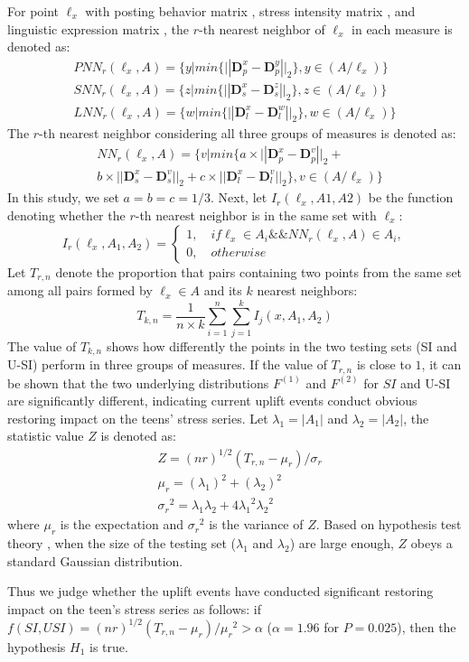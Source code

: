 For point $\ell_x$ with posting behavior matrix , stress intensity matrix ,
and linguistic expression matrix ,
the $r$-th nearest neighbor of $\ell_x$ in each measure is denoted as:
\begin{equation}
\begin{aligned}
& PNN_r(\ell_x,A)
= \{y | min\{||\textbf{D}_p^x-\textbf{D}_p^y ||_2\}, y\in(A/\ell_x)\} &\\
& SNN_r(\ell_x,A)
= \{z | min\{||\textbf{D}_s^x-\textbf{D}_s^z ||_2\}, z\in(A/\ell_x)\} \\
& LNN_r(\ell_x,A)
= \{w | min\{||\textbf{D}_l^x-\textbf{D}_l^w ||_2\}, w\in(A/\ell_x)\} &
 \end{aligned}
 \end{equation}
The $r$-th nearest neighbor considering all three groups of measures is denoted as:
\begin{align}
&NN_r(\ell_x,A) = \{v | min\{a \times ||\textbf{D}_p^x-\textbf{D}_p^v||_2+\\
&b \times ||\textbf{D}_s^x-\textbf{D}_s^v||_2+
c \times ||\textbf{D}_l^x-\textbf{D}_l^v||_2\}, v\in(A/\ell_x) \}
\end{align}
In this study, we set $a = b = c = 1/3$.
Next, let $I_r(\ell_x,A1,A2)$ be the function denoting whether the $r$-th nearest neighbor is in the same set with $\ell_x$:
\begin{equation}
I_r(\ell_x,A_1,A_2) =
\left\{ \begin{array}{ll}
1, \quad if \ell_x \in A_i  \&\& NN_r(\ell_x,A)\in A_i,\\
0, \quad otherwise
\end{array}
\right.
\end{equation}
Let $T_{r,n}$ denote the proportion that pairs containing two points from the same set among all pairs formed by $\ell_x \in A$
and its $k$ nearest neighbors:
\begin{equation}
T_{k,n}= \frac{1}{n\times k}\sum_{i=1}^{n}\sum_{j=1}^{k}I_j(x,A_1,A_2)
\end{equation}
The value of $T_{k,n}$ shows how differently the points in the two testing sets (SI and U-SI) perform in three groups of measures.
If the value of $T_{r,n}$ is close to $1$,
it can be shown that the two underlying distributions $F^{(1)}$ and $F^{(2)}$ for $SI$ and U-SI are significantly different,
indicating current uplift events conduct obvious restoring impact on the teens' stress series.
Let $\lambda_1=|A_1|$ and $\lambda_2=|A_2|$, the statistic value $Z$ is denoted as:
\begin{align}
&Z=(nr)^{1/2}(T_{r,n}-\mu_{r})/\sigma_{r}\\
&\mu_r=(\lambda_1)^2+(\lambda_2)^2\\
&{\sigma_r}^2=\lambda_1\lambda_2+4{\lambda_1}^2{\lambda_2}^2
\end{align}
where $\mu_r$ is the expectation and ${\sigma_r}^2$ is the variance of $Z$.
Based on hypothesis test theory \cite{Johnson2012Applied},
when the size of the testing set ($\lambda_1$ and $\lambda_2$) are large enough,
$Z$ obeys a standard Gaussian distribution.

Thus we judge whether the uplift events have conducted significant restoring impact on the teen's stress series as follows:
if $f(SI,USI)=(nr)^{1/2}(T_{r,n}-\mu_{r})/{\mu_r}^2>\alpha$ ($\alpha = 1.96$ for $P=0.025$),
then the hypothesis $H_1$ is true.

